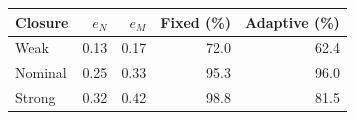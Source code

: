 \begin{tabular}{lrrrr}
\toprule
Closure & $e_N$ & $e_M$ & Fixed (\%) & Adaptive (\%) \\
\midrule
Weak & 0.13 & 0.17 & 72.0 & 62.4 \\
Nominal & 0.25 & 0.33 & 95.3 & 96.0 \\
Strong & 0.32 & 0.42 & 98.8 & 81.5 \\
\bottomrule
\end{tabular}
